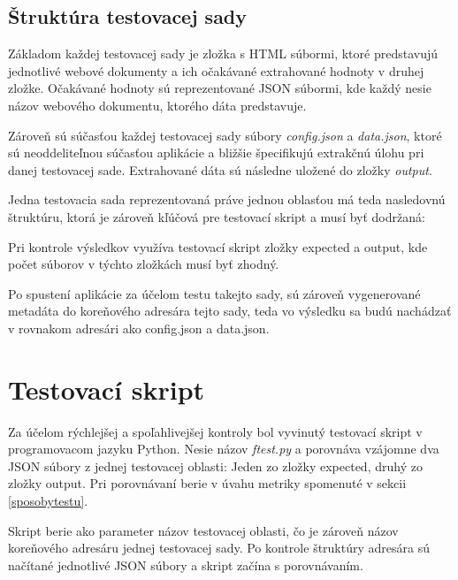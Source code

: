 \subsection{Štruktúra testovacej sady}

Základom každej testovacej sady je zložka s HTML súbormi, ktoré predstavujú jednotlivé webové dokumenty a ich očakávané extrahované hodnoty v druhej zložke. Očakávané hodnoty sú reprezentované JSON súbormi, kde každý nesie názov webového dokumentu, ktorého dáta predstavuje. 

Zároveň sú súčasťou každej testovacej sady súbory \textit{config.json} a \textit{data.json}, ktoré sú neoddeliteľnou súčasťou aplikácie a bližšie špecifikujú extrakčnú úlohu pri danej testovacej sade. Extrahované dáta sú následne uložené do zložky \textit{output}.

Jedna testovacia sada reprezentovaná práve jednou oblasťou má teda nasledovnú štruktúru, ktorá je zároveň kľúčová pre testovací skript a musí byť dodržaná:

\bigskip


\bigskip

Pri kontrole výsledkov využíva testovací skript zložky expected a output, kde počet súborov v týchto zložkách musí byť zhodný.

Po spustení aplikácie za účelom testu takejto sady, sú zároveň vygenerované metadáta do koreňového adresára tejto sady, teda vo výsledku sa budú nachádzať v rovnakom adresári ako config.json a data.json.


\section{Testovací skript}

Za účelom rýchlejšej a spoľahlivejšej kontroly bol vyvinutý testovací skript v programovacom jazyku Python. Nesie názov \textit{ftest.py} a porovnáva vzájomne dva JSON súbory z jednej testovacej oblasti: Jeden zo zložky expected, druhý zo zložky output. Pri porovnávaní berie v úvahu metriky spomenuté v sekcii \ref{sposobytestu}.

Skript berie ako parameter názov testovacej oblasti, čo je zároveň názov koreňového adresáru jednej testovacej sady. Po kontrole štruktúry adresára sú načítané jednotlivé JSON súbory a skript začína s porovnávaním.

